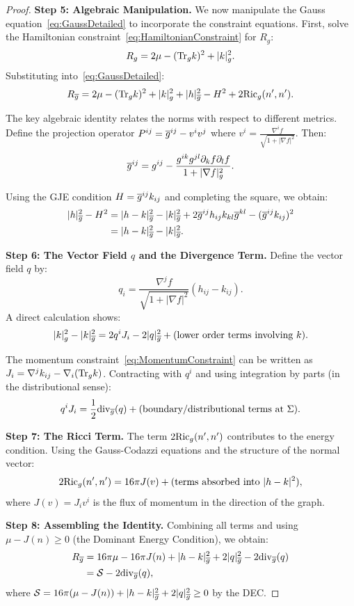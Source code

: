 \begin{proof}
\textbf{Step 5: Algebraic Manipulation.}
We now manipulate the Gauss equation~\eqref{eq:GaussDetailed} to incorporate the constraint equations. First, solve the Hamiltonian constraint~\eqref{eq:HamiltonianConstraint} for $R_g$:
\[
    R_g = 2\mu - (\mathrm{Tr}_g k)^2 + |k|_g^2.
\]
Substituting into~\eqref{eq:GaussDetailed}:
\begin{equation}\label{eq:GaussStep1}
    R_{\overline{g}} = 2\mu - (\mathrm{Tr}_g k)^2 + |k|_g^2 + |h|_{\overline{g}}^2 - H^2 + 2\mathrm{Ric}_g(n', n').
\end{equation}

The key algebraic identity relates the norms with respect to different metrics. Define the projection operator $P^{ij} = \overline{g}^{ij} - v^i v^j$ where $v^i = \frac{\nabla^i f}{\sqrt{1+|\nabla f|^2}}$. Then:
\[
    \overline{g}^{ij} = g^{ij} - \frac{g^{ik} g^{jl} \partial_k f \partial_l f}{1+|\nabla f|^2_g}.
\]

Using the GJE condition $H = \overline{g}^{ij} k_{ij}$ and completing the square, we obtain:
\begin{align*}
    |h|_{\overline{g}}^2 - H^2 &= |h - k|_{\overline{g}}^2 - |k|_{\overline{g}}^2 + 2\overline{g}^{ij} h_{ij} k_{kl} \overline{g}^{kl} - (\overline{g}^{ij}k_{ij})^2 \\
    &= |h - k|_{\overline{g}}^2 - |k|_{\overline{g}}^2.
\end{align*}

\textbf{Step 6: The Vector Field $q$ and the Divergence Term.}
Define the vector field $q$ by:
\[
    q_i = \frac{\nabla^j f}{\sqrt{1+|\nabla f|^2}} (h_{ij} - k_{ij}).
\]
A direct calculation shows:
\[
    |k|_g^2 - |k|_{\overline{g}}^2 = 2 q^i J_i - 2|q|_{\overline{g}}^2 + \text{(lower order terms involving } k \text{)}.
\]

The momentum constraint~\eqref{eq:MomentumConstraint} can be written as $J_i = \nabla^j k_{ij} - \nabla_i (\mathrm{Tr}_g k)$. Contracting with $q^i$ and using integration by parts (in the distributional sense):
\[
    q^i J_i = \frac{1}{2} \mathrm{div}_{\overline{g}}(q) + \text{(boundary/distributional terms at } \Sigma \text{)}.
\]

\textbf{Step 7: The Ricci Term.}
The term $2\mathrm{Ric}_g(n', n')$ contributes to the energy condition. Using the Gauss-Codazzi equations and the structure of the normal vector:
\[
    2\mathrm{Ric}_g(n', n') = 16\pi J(v) + \text{(terms absorbed into } |h-k|^2 \text{)},
\]
where $J(v) = J_i v^i$ is the flux of momentum in the direction of the graph.

\textbf{Step 8: Assembling the Identity.}
Combining all terms and using $\mu - J(n) \ge 0$ (the Dominant Energy Condition), we obtain:
\begin{align*}
    R_{\overline{g}} &= 16\pi\mu - 16\pi J(n) + |h-k|_{\overline{g}}^2 + 2|q|_{\overline{g}}^2 - 2\mathrm{div}_{\overline{g}}(q) \\
    &= \mathcal{S} - 2\mathrm{div}_{\overline{g}}(q),
\end{align*}
where $\mathcal{S} = 16\pi(\mu - J(n)) + |h-k|_{\overline{g}}^2 + 2|q|_{\overline{g}}^2 \ge 0$ by the DEC.


\end{proof}
